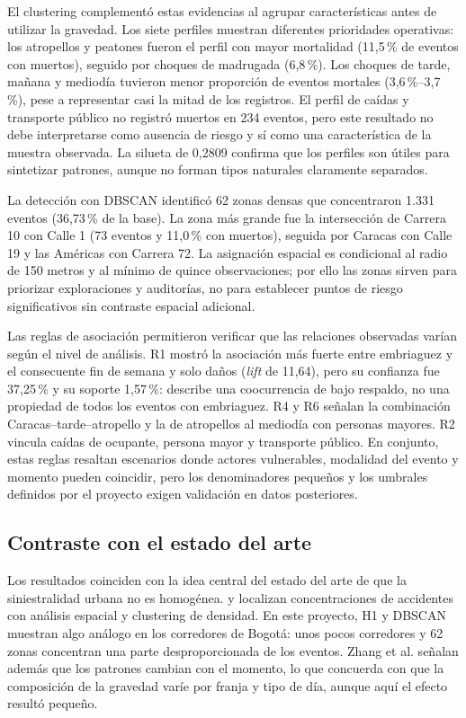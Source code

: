 \documentclass[12pt,letterpaper]{article}
\begin{document}
El clustering complementó estas evidencias al agrupar características antes
de utilizar la gravedad. Los siete perfiles muestran diferentes prioridades
operativas: los atropellos y peatones fueron el perfil con mayor mortalidad
(11,5\,\% de eventos con muertos), seguido por choques de madrugada (6,8\,\%).
Los choques de tarde, mañana y mediodía tuvieron menor proporción de eventos
mortales (3,6\,\%--3,7\,\%), pese a representar casi la mitad de los registros.
El perfil de caídas y transporte público no registró muertos en 234 eventos,
pero este resultado no debe interpretarse como ausencia de riesgo y sí como
una característica de la muestra observada. La silueta de 0,2809 confirma
que los perfiles son útiles para sintetizar patrones, aunque no forman tipos
naturales claramente separados.

La detección con DBSCAN identificó 62 zonas densas que concentraron 1.331
eventos (36,73\,\% de la base). La zona más grande fue la intersección de
Carrera 10 con Calle 1 (73 eventos y 11,0\,\% con muertos), seguida por Caracas
con Calle 19 y las Américas con Carrera 72. La asignación espacial es
condicional al radio de 150 metros y al mínimo de quince observaciones; por
ello las zonas sirven para priorizar exploraciones y auditorías, no para
establecer puntos de riesgo significativos sin contraste espacial adicional.

Las reglas de asociación permitieron verificar que las relaciones observadas
varían según el nivel de análisis. R1 mostró la asociación más fuerte entre
embriaguez y el consecuente fin de semana y solo daños (\emph{lift} de 11,64), pero
su confianza fue 37,25\,\% y su soporte 1,57\,\%: describe una coocurrencia de
bajo respaldo, no una propiedad de todos los eventos con embriaguez. R4 y R6
señalan la combinación Caracas--tarde--atropello y la de atropellos al
mediodía con personas mayores. R2 vincula caídas de ocupante, persona mayor
y transporte público. En conjunto, estas reglas resaltan escenarios donde
actores vulnerables, modalidad del evento y momento pueden coincidir, pero
los denominadores pequeños y los umbrales definidos por el proyecto exigen
validación en datos posteriores.

\subsection{Contraste con el estado del arte}

Los resultados coinciden con la idea central del estado del arte de que
la siniestralidad urbana no es homogénea. \citet{klaylee2022} y
\citet{zhang2023} localizan concentraciones de accidentes con análisis
espacial y clustering de densidad. En este proyecto, H1 y DBSCAN
muestran algo análogo en los corredores de Bogotá: unos pocos corredores
y 62 zonas concentran una parte desproporcionada de los eventos. Zhang
et al. señalan además que los patrones cambian con el momento, lo que
concuerda con que la composición de la gravedad varíe por franja y tipo
de día, aunque aquí el efecto resultó pequeño.
\end{document}

